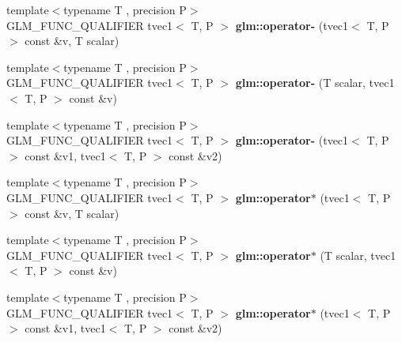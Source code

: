 \begin{DoxyCompactItemize}
\item 
\mbox{\label{type__vec1_8inl_a894e196c5d37b1e34fc0ed048fd917a5}} 
{\footnotesize template$<$typename T , precision P$>$ }\\G\+L\+M\+\_\+\+F\+U\+N\+C\+\_\+\+Q\+U\+A\+L\+I\+F\+I\+ER tvec1$<$ T, P $>$ {\bfseries glm\+::operator-\/} (tvec1$<$ T, P $>$ const \&v, T scalar)
\item 
\mbox{\label{type__vec1_8inl_a5c15fcefe654ab39d1db7f56b434afd6}} 
{\footnotesize template$<$typename T , precision P$>$ }\\G\+L\+M\+\_\+\+F\+U\+N\+C\+\_\+\+Q\+U\+A\+L\+I\+F\+I\+ER tvec1$<$ T, P $>$ {\bfseries glm\+::operator-\/} (T scalar, tvec1$<$ T, P $>$ const \&v)
\item 
\mbox{\label{type__vec1_8inl_a1c711f6ec4149bf2353559dce01d3905}} 
{\footnotesize template$<$typename T , precision P$>$ }\\G\+L\+M\+\_\+\+F\+U\+N\+C\+\_\+\+Q\+U\+A\+L\+I\+F\+I\+ER tvec1$<$ T, P $>$ {\bfseries glm\+::operator-\/} (tvec1$<$ T, P $>$ const \&v1, tvec1$<$ T, P $>$ const \&v2)
\item 
\mbox{\label{type__vec1_8inl_abebb6c69db71758a6bf6d4540cb4075a}} 
{\footnotesize template$<$typename T , precision P$>$ }\\G\+L\+M\+\_\+\+F\+U\+N\+C\+\_\+\+Q\+U\+A\+L\+I\+F\+I\+ER tvec1$<$ T, P $>$ {\bfseries glm\+::operator$\ast$} (tvec1$<$ T, P $>$ const \&v, T scalar)
\item 
\mbox{\label{type__vec1_8inl_a62f1cb5e7912117b0eeb11febcf1cbd0}} 
{\footnotesize template$<$typename T , precision P$>$ }\\G\+L\+M\+\_\+\+F\+U\+N\+C\+\_\+\+Q\+U\+A\+L\+I\+F\+I\+ER tvec1$<$ T, P $>$ {\bfseries glm\+::operator$\ast$} (T scalar, tvec1$<$ T, P $>$ const \&v)
\item 
\mbox{\label{type__vec1_8inl_a5e9aeb3518efcd20d4f0ab05b7c69c0d}} 
{\footnotesize template$<$typename T , precision P$>$ }\\G\+L\+M\+\_\+\+F\+U\+N\+C\+\_\+\+Q\+U\+A\+L\+I\+F\+I\+ER tvec1$<$ T, P $>$ {\bfseries glm\+::operator$\ast$} (tvec1$<$ T, P $>$ const \&v1, tvec1$<$ T, P $>$ const \&v2)
\item 

\end{DoxyCompactItemize}
